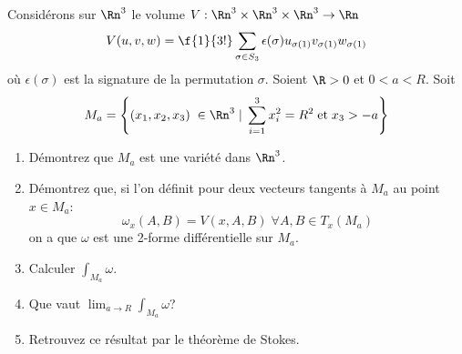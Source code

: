 
\begin{exercice}\label{exoVariete0020}

Considérons sur $\Rn^3$ le volume $V:\Rn^3\times\Rn^3\times\Rn^3\rightarrow \Rn$ \[V(u,v,w)=\f{1}{3!}\sum_{\sigma\in S_3}\epsilon(\sigma)u_{\sigma(1)}v_{\sigma(1)}w_{\sigma(1)}\] où $\epsilon(\sigma)$ est la signature de la permutation $\sigma$. Soient $\R>0$ et $0<a<R$. Soit \[M_a=\left\{ ( x_1, x_2, x_3)\; \in \Rn^3 \; | \; \sum_{i=1}^3x_i^2 = R^2 \; {\rm et} \; x_3>-a\right\}\]
\begin{enumerate}
\item Démontrez que $M_a$ est une variété dans $\Rn^3$.
\item Démontrez que, si l'on définit pour deux vecteurs tangents à $M_a$ au point $x\in M_a$: \[\omega_x(A,B)=V(x,A,B) \; \forall A, B \in T_x(M_a)\] on a que $\omega$ est une 2-forme différentielle sur $M_a$.
\item Calculer $\int_{M_a}\omega$.
\item Que vaut $\lim_{a\rightarrow  R} \int_{M_a}\omega$?
\item Retrouvez ce résultat par le théorème de Stokes.
\end{enumerate}


\end{exercice}
